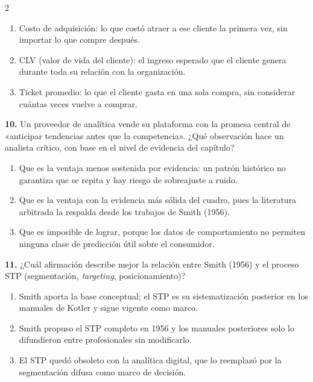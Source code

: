 \documentclass[10pt,letterpaper]{article}
\begin{document}
\begin{multicols}{2}
\begin{enumerate}[label=\alph*),leftmargin=1.1em,itemsep=0pt,topsep=1pt,parsep=0pt,partopsep=0pt]
\item Costo de adquisición: lo que costó atraer a ese cliente la primera vez, sin importar lo que compre después.
\item CLV (valor de vida del cliente): el ingreso esperado que el cliente genera durante toda su relación con la organización.
\item Ticket promedio: lo que el cliente gasta en una sola compra, sin considerar cuántas veces vuelve a comprar.
\end{enumerate}
\vspace{2pt}
\noindent\textbf{10.} Un proveedor de analítica vende su plataforma con la promesa central de «anticipar tendencias antes que la competencia». ¿Qué observación hace un analista crítico, con base en el nivel de evidencia del capítulo?
\vspace{-3pt}
\begin{enumerate}[label=\alph*),leftmargin=1.1em,itemsep=0pt,topsep=1pt,parsep=0pt,partopsep=0pt]
\item Que es la ventaja menos sostenida por evidencia: un patrón histórico no garantiza que se repita y hay riesgo de sobreajuste a ruido.
\item Que es la ventaja con la evidencia más sólida del cuadro, pues la literatura arbitrada la respalda desde los trabajos de Smith (1956).
\item Que es imposible de lograr, porque los datos de comportamiento no permiten ninguna clase de predicción útil sobre el consumidor.
\end{enumerate}
\vspace{2pt}
\noindent\textbf{11.} ¿Cuál afirmación describe mejor la relación entre Smith (1956) y el proceso STP (segmentación, \textit{targeting}, posicionamiento)?
\vspace{-3pt}
\begin{enumerate}[label=\alph*),leftmargin=1.1em,itemsep=0pt,topsep=1pt,parsep=0pt,partopsep=0pt]
\item Smith aporta la base conceptual; el STP es su sistematización posterior en los manuales de Kotler y sigue vigente como marco.
\item Smith propuso el STP completo en 1956 y los manuales posteriores solo lo difundieron entre profesionales sin modificarlo.
\item El STP quedó obsoleto con la analítica digital, que lo reemplazó por la segmentación difusa como marco de decisión.

\end{enumerate}
\end{multicols}
\end{document}
